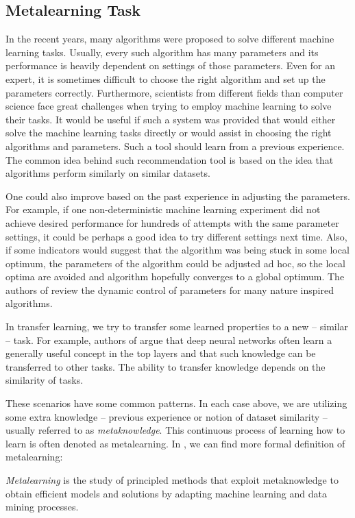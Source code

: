 \subsection{Metalearning Task}
In the recent years, many algorithms were proposed to solve different machine learning tasks. Usually, every such algorithm has many parameters and its performance is heavily dependent on settings of those parameters. Even for an expert, it is sometimes difficult to choose the right algorithm and set up the parameters correctly. Furthermore, scientists from different fields than computer science face great challenges when trying to employ machine learning to solve their tasks. It would be useful if such a system was provided that would either solve the machine learning tasks directly or would assist in choosing the right algorithms and parameters. Such a tool should learn from a previous experience. The common idea behind such recommendation tool is based on the idea that algorithms perform similarly on similar datasets.

One could also improve based on the past experience in adjusting the parameters. For example, if one non-deterministic machine learning experiment did not achieve desired performance for hundreds of attempts with the same parameter settings, it could be perhaps a good idea to try different settings next time. Also, if some indicators would suggest that the algorithm was being stuck in some local optimum, the parameters of the algorithm could be adjusted ad hoc, so the local optima are avoided and algorithm hopefully converges to a global optimum. The authors of \cite{algorithmControl} review the dynamic control of parameters for many nature inspired algorithms.

In transfer learning, we try to transfer some learned properties to a new -- similar -- task. For example, authors of \cite{TransferabilityDeepNeuralNetworks} argue that deep neural networks often learn a generally useful concept in the top layers and that such knowledge can be transferred to other tasks. The ability to transfer knowledge depends on the similarity of tasks.

These scenarios have some common patterns. In each case above, we are utilizing some extra knowledge -- previous experience or notion of dataset similarity -- usually referred to as \emph{metaknowledge}. This continuous process of learning how to learn is often denoted as metalearning.
In \cite{BrazdilMetalearning-2009}, we can find more formal definition of metalearning:
\begin{definition}
	\emph{Metalearning} is the study of principled methods that exploit metaknowledge to obtain efficient models and solutions by adapting machine learning and data mining processes.
\end{definition}

